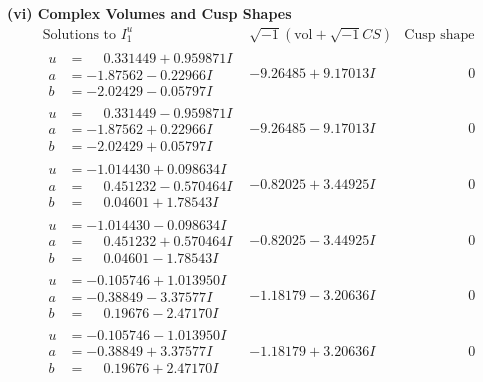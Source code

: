 \documentclass[1p]{elsarticle_modified}
\theoremstyle{definition}
\newcommand{\I}{\sqrt{-1}}
\begin{document}
\newpage\flushleft \textbf{(vi) Complex Volumes and Cusp Shapes}
$$\begin{array}{c|c|c}  
\text{Solutions to }I^u_{1}& \I (\text{vol} + \sqrt{-1}CS) & \text{Cusp shape}\\
 \hline 
\begin{aligned}
u &= \phantom{-}0.331449 + 0.959871 I \\
a &= -1.87562 - 0.22966 I \\
b &= -2.02429 - 0.05797 I\end{aligned}
 & -9.26485 + 9.17013 I & \phantom{-0.000000 } 0 \\ \hline\begin{aligned}
u &= \phantom{-}0.331449 - 0.959871 I \\
a &= -1.87562 + 0.22966 I \\
b &= -2.02429 + 0.05797 I\end{aligned}
 & -9.26485 - 9.17013 I & \phantom{-0.000000 } 0 \\ \hline\begin{aligned}
u &= -1.014430 + 0.098634 I \\
a &= \phantom{-}0.451232 - 0.570464 I \\
b &= \phantom{-}0.04601 + 1.78543 I\end{aligned}
 & -0.82025 + 3.44925 I & \phantom{-0.000000 } 0 \\ \hline\begin{aligned}
u &= -1.014430 - 0.098634 I \\
a &= \phantom{-}0.451232 + 0.570464 I \\
b &= \phantom{-}0.04601 - 1.78543 I\end{aligned}
 & -0.82025 - 3.44925 I & \phantom{-0.000000 } 0 \\ \hline\begin{aligned}
u &= -0.105746 + 1.013950 I \\
a &= -0.38849 - 3.37577 I \\
b &= \phantom{-}0.19676 - 2.47170 I\end{aligned}
 & -1.18179 - 3.20636 I & \phantom{-0.000000 } 0 \\ \hline\begin{aligned}
u &= -0.105746 - 1.013950 I \\
a &= -0.38849 + 3.37577 I \\
b &= \phantom{-}0.19676 + 2.47170 I\end{aligned}
 & -1.18179 + 3.20636 I & \phantom{-0.000000 } 0 \\ \hline\begin{aligned}

\end{aligned}
\end{array}$$
\end{document}
